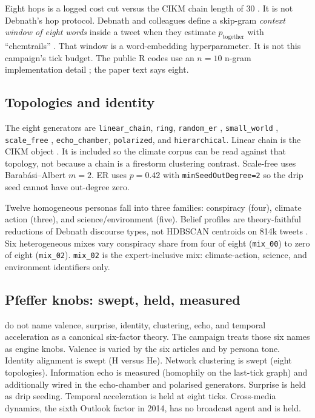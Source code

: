 Eight hops is a logged cost cut versus the CIKM chain length of 30 \parencite{maurya2025simulating}.
It is not Debnath's hop protocol.
Debnath and colleagues define a skip-gram \emph{context window of eight words} inside a tweet when they estimate $p_{\mathrm{together}}$ with \enquote{chemtrails} \parencite{debnath2023conspiracy}.
That window is a word-embedding hyperparameter.
It is not this campaign's tick budget.
The public R codes use an $n=10$ n-gram implementation detail \parencite{geoeng2023codes}; the paper text says eight.

\subsection{Topologies and identity}

The eight generators are \texttt{linear\_chain}, \texttt{ring}, \texttt{random\_er} \parencite{erdos1960evolution}, \texttt{small\_world} \parencite{watts1998collective}, \texttt{scale\_free} \parencite{barabasi1999emergence}, \texttt{echo\_chamber}, \texttt{polarized}, and \texttt{hierarchical}.
Linear chain is the CIKM object \parencite{maurya2025simulating}.
It is included so the climate corpus can be read against that topology, not because a chain is a firestorm clustering contrast.
Scale-free uses Barabási--Albert $m=2$.
ER uses $p=0.42$ with \texttt{minSeedOutDegree=2} so the drip seed cannot have out-degree zero.

Twelve homogeneous personas fall into three families: conspiracy (four), climate action (three), and science/environment (five).
Belief profiles are theory-faithful reductions of Debnath discourse types, not HDBSCAN centroids on 814k tweets \parencite{debnath2023conspiracy}.
Six heterogeneous mixes vary conspiracy share from four of eight (\texttt{mix\_00}) to zero of eight (\texttt{mix\_02}).
\texttt{mix\_02} is the expert-inclusive mix: climate-action, science, and environment identifiers only.

\subsection{Pfeffer knobs: swept, held, measured}

\textcite{pfeffer2014firestorms} do not name valence, surprise, identity, clustering, echo, and temporal acceleration as a canonical six-factor theory.
The campaign treats those six names as engine knobs.
Valence is varied by the six articles and by persona tone.
Identity alignment is swept (H versus He).
Network clustering is swept (eight topologies).
Information echo is measured (homophily on the last-tick graph) and additionally wired in the echo-chamber and polarised generators.
Surprise is held as drip seeding.
Temporal acceleration is held at eight ticks.
Cross-media dynamics, the sixth Outlook factor in 2014, has no broadcast agent and is held.

